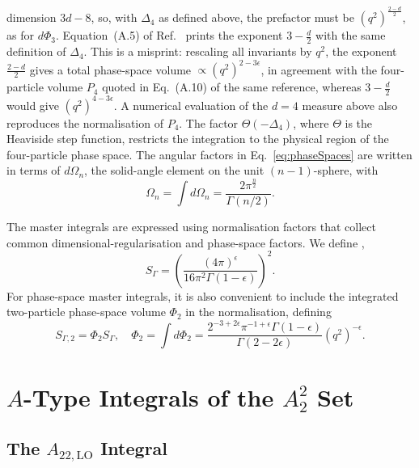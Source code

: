 dimension $3d-8$, so, with $\Delta_4$ as defined above, the prefactor must be $\left(q^2\right)^{\frac{2-d}{2}}$,
as for $d\Phi_3$. Equation~(A.5) of Ref.~\cite{GehrmannDeRidder0311276} prints the exponent $3-\frac d2$ with the same
definition of $\Delta_4$. This is a misprint: rescaling all invariants by $q^2$, the exponent
$\frac{2-d}{2}$ gives a total phase-space volume $\propto\left(q^2\right)^{2-3\epsilon}$, in agreement with
the four-particle volume $P_4$ quoted in Eq.~(A.10) of the same reference, whereas $3-\frac d2$ would
give $\left(q^2\right)^{4-3\epsilon}$. A numerical evaluation of the $d=4$ measure above also reproduces the
normalisation of $P_4$.
The factor $\Theta(-\Delta_4)$, where $\Theta$ is the Heaviside step function, restricts the integration
to the physical region of the four-particle phase space. The angular factors in
Eq.~\eqref{eq:phaseSpaces} are written in terms of $d\Omega_n$, the solid-angle element on the unit
$(n-1)$-sphere, with
\begin{equation}
    \Omega_n=\int d\Omega_n=\frac{2\pi^{\frac n2}}{\Gamma(n/2)}.
\end{equation}

The master integrals are expressed using normalisation factors that collect common
dimensional-regularisation and phase-space factors. We define
\cite{Gehrmann-DeRidder:2004ttg,GehrmannDeRidder0311276},
\begin{equation}
    S_\Gamma = \left(\frac{(4\pi)^\epsilon}{16\pi^2\Gamma(1-\epsilon)}\right)^2.\label{eq:SGamma}
\end{equation}
For phase-space master integrals, it is also convenient to include the integrated two-particle
phase-space volume $\Phi_2$ in the normalisation, defining
\begin{equation}
    S_{\Gamma,2} = \Phi_2 S_\Gamma,\quad \Phi_2 = \int d\Phi_2 = \frac{2^{-3+2\epsilon}\pi^{-1+\epsilon}\Gamma(1-\epsilon)}{\Gamma(2-2\epsilon)}\!\left(q^2\right)^{-\epsilon}.
\end{equation}

\section{$A$-Type Integrals of the $A_2^2$ Set}\label{sec:MIA22}

\subsection{The $A_{22,\text{LO}}$ Integral}

